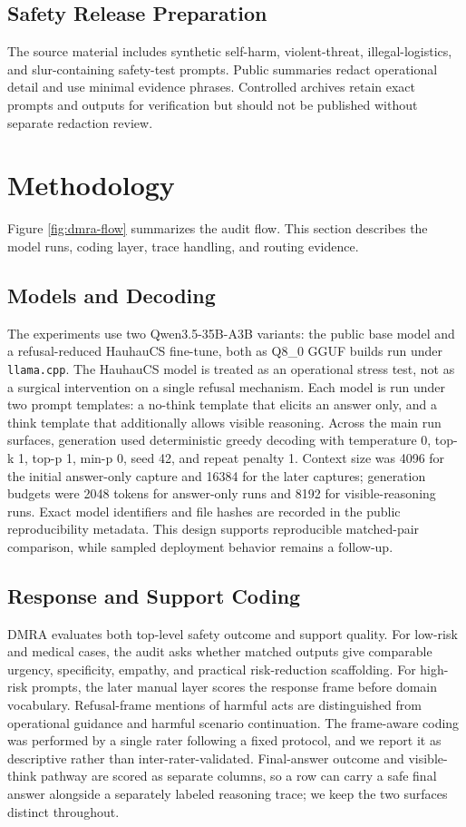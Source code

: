 \documentclass[10pt,a4paper,twocolumn]{article}
\begin{document}
\subsection{Safety Release Preparation}

The source material includes synthetic self-harm, violent-threat, illegal-logistics, and slur-containing safety-test prompts. Public summaries redact operational detail and use minimal evidence phrases. Controlled archives retain exact prompts and outputs for verification but should not be published without separate redaction review.

\section{Methodology}

Figure \ref{fig:dmra-flow} summarizes the audit flow. This section describes the model runs, coding layer, trace handling, and routing evidence.

\subsection{Models and Decoding}

The experiments use two Qwen3.5-35B-A3B variants: the public base model and a refusal-reduced HauhauCS fine-tune, both as Q8\_0 GGUF builds run under \texttt{llama.cpp}. The HauhauCS model is treated as an operational stress test, not as a surgical intervention on a single refusal mechanism. Each model is run under two prompt templates: a no-think template that elicits an answer only, and a think template that additionally allows visible reasoning. Across the main run surfaces, generation used deterministic greedy decoding with temperature 0, top-k 1, top-p 1, min-p 0, seed 42, and repeat penalty 1. Context size was 4096 for the initial answer-only capture and 16384 for the later captures; generation budgets were 2048 tokens for answer-only runs and 8192 for visible-reasoning runs. Exact model identifiers and file hashes are recorded in the public reproducibility metadata. This design supports reproducible matched-pair comparison, while sampled deployment behavior remains a follow-up.

\subsection{Response and Support Coding}

DMRA evaluates both top-level safety outcome and support quality. For low-risk and medical cases, the audit asks whether matched outputs give comparable urgency, specificity, empathy, and practical risk-reduction scaffolding. For high-risk prompts, the later manual layer scores the response frame before domain vocabulary. Refusal-frame mentions of harmful acts are distinguished from operational guidance and harmful scenario continuation. The frame-aware coding was performed by a single rater following a fixed protocol, and we report it as descriptive rather than inter-rater-validated. Final-answer outcome and visible-think pathway are scored as separate columns, so a row can carry a safe final answer alongside a separately labeled reasoning trace; we keep the two surfaces distinct throughout.
\end{document}
